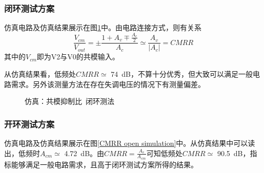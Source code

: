 \documentclass[UTF8]{ctexart}
\numberwithin{figure}{subsection}
\numberwithin{table}{subsection}
\numberwithin{equation}{subsection}
\begin{document}
\subsubsection{闭环测试方案}
仿真电路及仿真结果展示在图\ref{CMRR closed simulation}中。由电路连接方式，则有关系
\[\frac{V_{cm}}{V_{out}} = \pm \frac{1+A_v \mp \frac{A_c}{2}}{A_c} \simeq \frac{A_v}{|A_c|} = CMRR\]
其中的\(V_{cm}\)即为V2与V0的共模输入。

从仿真结果看，低频处\(CMRR \simeq \) \SI[]{74}{\dB}，不算十分优秀，但大致可以满足一般电路需求。另外该测量方法在存在失调电压的情况下有测量偏差。

\begin{figure}[H]
    \centering
    \caption{仿真：共模抑制比\ 闭环测法}
    \label{CMRR closed simulation}
\end{figure}

\subsubsection{开环测试方案}
仿真电路及仿真结果展示在图\ref{CMRR open simulation}中。从仿真结果中可以读出，低频时\(A_{cm} \simeq\) \SI[]{4.72}{\dB}。由\(CMRR = \frac{A_v}{A_{cm}}\)可知低频处\(CMRR \simeq\) \SI[]{90.5}{\dB}，指标能够满足一般电路需求，且高于闭环测试方案所得的结果。
\end{document}
